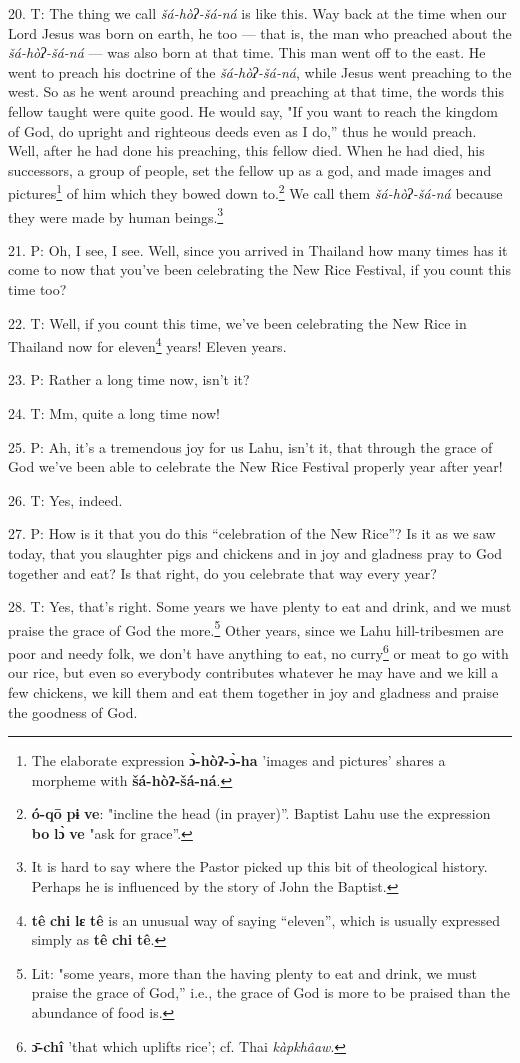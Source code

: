 20. T: The thing we call \textit{šá-hòʔ-šá-ná }is like this. Way back at
the time when our Lord Jesus was born on earth, he too --- that is, the man who
preached about the \textit{šá-hòʔ-šá-ná} --- was also born at that time.
This man went off to the east. He went to preach his doctrine of the \textit{šá-hòʔ-šá-ná},
while Jesus went preaching to the west. So as he went around preaching and preaching
at that time, the words this fellow taught were quite good. He would say, "If
you want to reach the kingdom of God, do upright and righteous deeds even as I
do,'' thus he would preach. Well, after he had done his preaching, this fellow
died. When he had died, his successors, a group of people, set the fellow up as
a god, and made images and pictures\footnote{The elaborate expression \textbf{ɔ̀-hòʔ-ɔ̀-ha} 'images and pictures' shares a morpheme with \textbf{šá-hòʔ-šá-ná}.} of him which they bowed down to.\footnote{\textbf{ó-qō} \textbf{pɨ} \textbf{ve}: "incline the head (in prayer)''. Baptist Lahu use the expression \textbf{bo} \textbf{lɔ̀} \textbf{ve} "ask for grace''.} We
call them \textit{šá-hòʔ-šá-ná} because they were made by human beings.\footnote{It is hard to say where the Pastor picked up this bit of theological history. Perhaps he is influenced by the story of John the Baptist.}

21. P: Oh, I see, I see. Well, since you arrived in Thailand how many times has
it come to now that you've been celebrating the New Rice Festival, if you count
this time too?

22. T: Well, if you count this time, we've been celebrating the New Rice in Thailand
now for eleven\footnote{\textbf{tê} \textbf{chi} \textbf{lɛ} \textbf{tê} is an unusual way of saying ``eleven'', which is usually expressed simply as \textbf{tê} \textbf{chi} \textbf{tê}.} years! Eleven years.

23. P: Rather a long time now, isn't it?

24. T: Mm, quite a long time now!

25. P: Ah, it's a tremendous joy for us Lahu, isn't it, that through the grace of
God we've been able to celebrate the New Rice Festival properly year after year!

26. T: Yes, indeed.

27. P: How is it that you do this ``celebration of the New Rice''?
Is it as we saw today, that you slaughter pigs and chickens and in joy and gladness
pray to God together and eat? Is that right, do you celebrate that way every year?

28. T: Yes, that's right. Some years we have plenty to eat and drink, and we must
praise the grace of God the more.\footnote{Lit: "some years, more than the having plenty to eat and drink, we must praise the grace of God,'' i.e., the grace of God is more to be praised than the abundance of food is.} Other years, since we Lahu hill-tribesmen
are poor and needy folk, we don't have anything to eat, no curry\footnote{\textbf{ɔ̄-chî} 'that which uplifts rice'; cf. Thai \textit{kàpkhâaw}.} or meat to
go with our rice, but even so everybody contributes whatever he may have and we
kill a few chickens, we kill them and eat them together in joy and gladness and
praise the goodness of God.

